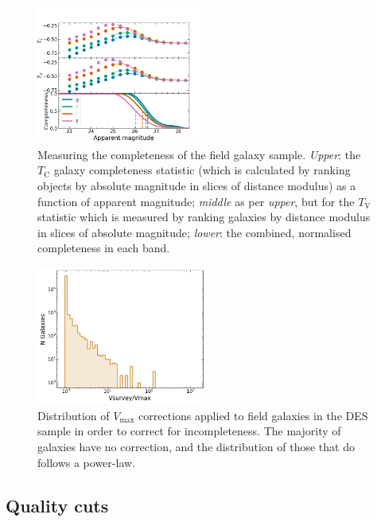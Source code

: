 \documentclass[fleqn,usenatbib]{mnras}
\begin{document}
\begin{figure}
    \centering
    \includegraphics[width=0.5\textwidth]{figs/completeness_combined.png}
    \caption{Measuring the completeness of the field galaxy sample. \textit{Upper}: the $T_{\mathrm{C}}$ galaxy completeness statistic (which is calculated by ranking objects by absolute magnitude in slices of distance modulus) as a function of apparent magnitude; \textit{middle} as per \textit{upper}, but for the $T_{\mathrm{V}}$ statistic which is measured by ranking galaxies by distance modulus in slices of absolute magnitude; \textit{lower}: the combined, normalised completeness in each band.  
    \label{fig:completeness}}
\end{figure}

\begin{figure}
    \centering
    \includegraphics[width=0.5\textwidth]{figs/field_vmax.png}
    \caption{Distribution of $V_{\mathrm{max}}$ corrections applied to field galaxies in the DES sample in order to correct for incompleteness. The majority of galaxies have no correction, and the distribution of those that do follows a power-law.
    \label{fig:vmax_field}}
\end{figure}

\subsection{Quality cuts \label{subsec:cuts}}
\end{document}
